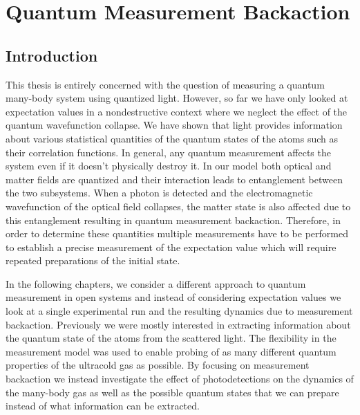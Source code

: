 
\chapter{Quantum Measurement Backaction}  

\ifpdf
    \graphicspath{{Chapter4/Figs/Raster/}{Chapter4/Figs/PDF/}{Chapter4/Figs/}}
\else
    \graphicspath{{Chapter4/Figs/Vector/}{Chapter4/Figs/}}
\fi



\section{Introduction}

This thesis is entirely concerned with the question of measuring a
quantum many-body system using quantized light. However, so far we
have only looked at expectation values in a nondestructive context
where we neglect the effect of the quantum wavefunction collapse. We
have shown that light provides information about various statistical
quantities of the quantum states of the atoms such as their
correlation functions. In general, any quantum measurement affects the
system even if it doesn't physically destroy it. In our model both
optical and matter fields are quantized and their interaction leads to
entanglement between the two subsystems. When a photon is detected and
the electromagnetic wavefunction of the optical field collapses, the
matter state is also affected due to this entanglement resulting in
quantum measurement backaction. Therefore, in order to determine these
quantities multiple measurements have to be performed to establish a
precise measurement of the expectation value which will require
repeated preparations of the initial state.

In the following chapters, we consider a different approach to quantum
measurement in open systems and instead of considering expectation
values we look at a single experimental run and the resulting dynamics
due to measurement backaction. Previously we were mostly interested in
extracting information about the quantum state of the atoms from the
scattered light. The flexibility in the measurement model was used to
enable probing of as many different quantum properties of the
ultracold gas as possible. By focusing on measurement backaction we
instead investigate the effect of photodetections on the dynamics of
the many-body gas as well as the possible quantum states that we can
prepare instead of what information can be extracted.


